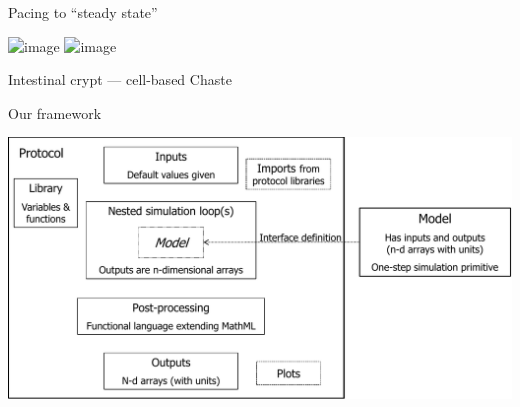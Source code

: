 \documentclass[t,xcolor={usenames,dvipsnames}]{beamer}
\begin{document}
\begin{frame}{Pacing to ``steady state''}
\begin{center}
\includegraphics<1>[width=\textwidth]{matsuoka_pace_all_state_variables}
\includegraphics<2>[width=\textwidth]{st_st_diag}
\end{center}
\end{frame}


\begin{frame}{Intestinal crypt --- cell-based Chaste}
\begin{center}
\end{center}
\end{frame}


\begin{frame}{Our framework}
\begin{center}
\vspace{-.5cm}\hspace*{-.75cm}\includegraphics[width=1.15\textwidth]{proto_diag}
\end{center}
\end{frame}
\end{document}
